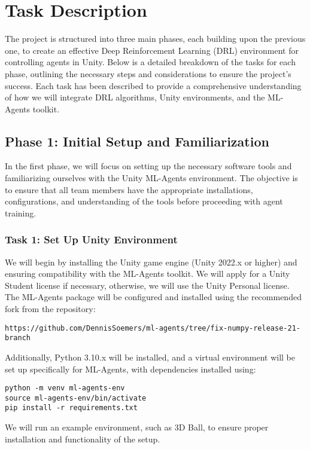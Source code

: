 \documentclass{article}
\begin{document}
\section{Task Description}
\begin{flushleft}

\hspace{2em}The project is structured into three main phases, each building upon the previous one, to create an effective Deep Reinforcement Learning (DRL) environment for controlling agents in Unity. Below is a detailed breakdown of the tasks for each phase, outlining the necessary steps and considerations to ensure the project's success. Each task has been described to provide a comprehensive understanding of how we will integrate DRL algorithms, Unity environments, and the ML-Agents toolkit.

\subsection{Phase 1: Initial Setup and Familiarization}

\hspace{2em}In the first phase, we will focus on setting up the necessary software tools and familiarizing ourselves with the Unity ML-Agents environment. The objective is to ensure that all team members have the appropriate installations, configurations, and understanding of the tools before proceeding with agent training.

\subsubsection{Task 1: Set Up Unity Environment}
\hspace{2em}We will begin by installing the Unity game engine (Unity 2022.x or higher) and ensuring compatibility with the ML-Agents toolkit. We will apply for a Unity Student license if necessary, otherwise, we will use the Unity Personal license. The ML-Agents package will be configured and installed using the recommended fork from the repository:
\begin{verbatim}
https://github.com/DennisSoemers/ml-agents/tree/fix-numpy-release-21-branch
\end{verbatim}
Additionally, Python 3.10.x will be installed, and a virtual environment will be set up specifically for ML-Agents, with dependencies installed using:
\begin{verbatim}
python -m venv ml-agents-env
source ml-agents-env/bin/activate
pip install -r requirements.txt
\end{verbatim}
We will run an example environment, such as 3D Ball, to ensure proper installation and functionality of the setup.


\end{flushleft}
\end{document}
